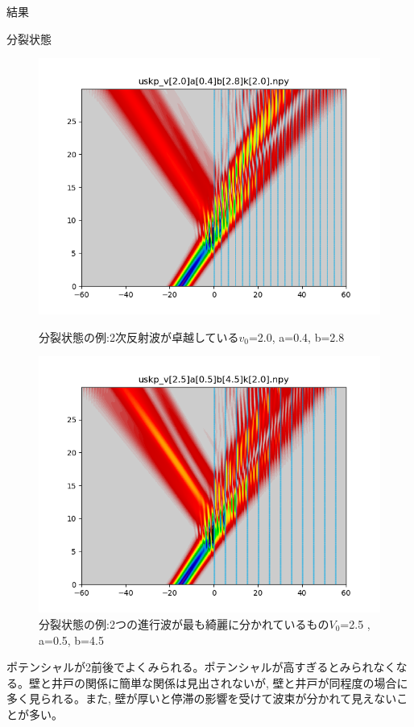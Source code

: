 \documentclass[a4paper, lualatex]{bxjsarticle}
\begin{document}
\begin{section}{結果}
\begin{subsection}{分裂状態}
\begin{figure}[h]
\begin{minipage}{0.5\hsize}
                \centering
                \includegraphics[width=0.9\hsize]{bunretsu3.png}
                \caption{分裂状態の例:2次反射波が卓越している$v_0$=2.0, a=0.4, b=2.8}
                \label{split_1}
            \end{minipage}
            \begin{minipage}{0.5\hsize}
                \centering
                \includegraphics[width=0.9\hsize]{bunretsu4.png}
                \caption{分裂状態の例:2つの進行波が最も綺麗に分かれているもの$V_0$=2.5 , a=0.5, b=4.5}
            \end{minipage}
        \end{figure}
    \par ポテンシャルが2前後でよくみられる。ポテンシャルが高すぎるとみられなくなる。壁と井戸の関係に簡単な関係は見出されないが, 壁と井戸が同程度の場合に多く見られる。また, 壁が厚いと停滞の影響を受けて波束が分かれて見えないことが多い。

\end{subsection}
\end{section}
\end{document}
